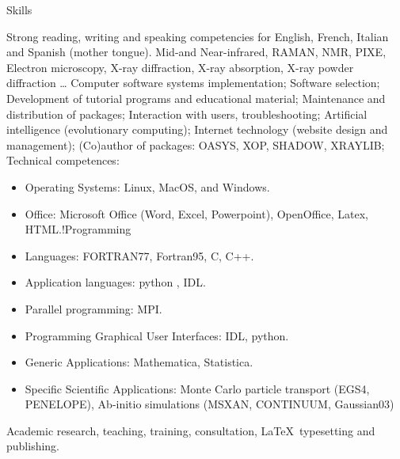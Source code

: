 \prefix{}
\begin{rubric}{Skills}


\entry*[Languages]
	Strong reading, writing and speaking competencies for English, French, Italian and Spanish (mother tongue).
	 Mid-and Near-infrared, RAMAN, NMR, PIXE, Electron microscopy, X-ray diffraction, X-ray absorption, X-ray powder diffraction \ldots
\entry*[Computer]
Computer software systems implementation; Software selection; Development of tutorial programs and educational material; Maintenance and distribution of packages; Interaction with users, troubleshooting; Artificial intelligence (evolutionary computing); Internet technology (website design and management); (Co)author of packages: OASYS, XOP, SHADOW, XRAYLIB; Technical competences:
\begin{itemize}
\item Operating Systems: Linux, MacOS, and Windows.
\item Office: Microsoft Office (Word, Excel, Powerpoint), OpenOffice, Latex, HTML.!Programming \item Languages: FORTRAN77, Fortran95, C, C++.
\item Application languages: python , IDL.
\item Parallel programming: MPI.
\item Programming Graphical User Interfaces: IDL, python.
\item Generic Applications: Mathematica, Statistica.
\item Specific Scientific Applications: Monte Carlo particle transport (EGS4, PENELOPE), Ab-initio simulations (MSXAN, CONTINUUM, Gaussian03)
\end{itemize}
\entry*[Misc.]
	Academic research, teaching, training, consultation, \LaTeX\ typesetting and publishing.
\end{rubric}
